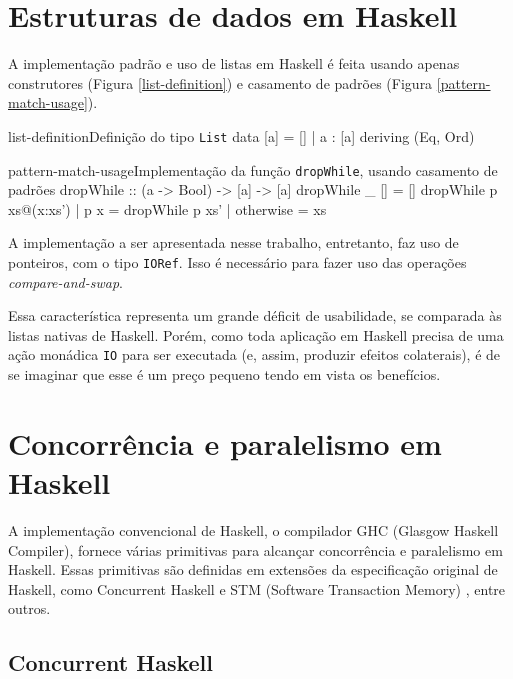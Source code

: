 \documentclass[a4paper,12pt,oldfontcommands]{abntex2}
\begin{document}
\section{Estruturas de dados em Haskell}

A implementação padrão e uso de listas em Haskell é feita usando apenas construtores (Figura \ref{list-definition}) e casamento de padrões (Figura \ref{pattern-match-usage}).

\begin{code}{list-definition}{Definição do tipo \texttt{List} \cite{jones2003haskell}}
data [a] =  [] | a : [a] deriving (Eq, Ord)
\end{code}

\begin{code}{pattern-match-usage}{Implementação da função \texttt{dropWhile}, usando casamento de padrões}
dropWhile :: (a -> Bool) -> [a] -> [a]
dropWhile _ []          =  []
dropWhile p xs@(x:xs')
            | p x       =  dropWhile p xs'
            | otherwise =  xs
\end{code}

A implementação a ser apresentada nesse trabalho, entretanto, faz uso de ponteiros, com o tipo \texttt{IORef}. Isso é necessário para fazer uso das operações \textit{compare-and-swap}.

Essa característica representa um grande déficit de usabilidade, se comparada às listas nativas de Haskell. Porém, como toda aplicação em Haskell precisa de uma ação monádica \texttt{IO} para ser executada (e, assim, produzir efeitos colaterais), é de se imaginar que esse é um preço pequeno tendo em vista os benefícios.

\section{Concorrência e paralelismo em Haskell}

A implementação convencional de Haskell, o compilador GHC (Glasgow Haskell Compiler), fornece várias primitivas para alcançar concorrência e paralelismo em Haskell. Essas primitivas são definidas em extensões da especificação original de Haskell, como Concurrent Haskell \cite{jones1996concurrent} e STM (Software Transaction Memory) \cite{harris2005composable}, entre outros.

\subsection{Concurrent Haskell}
\end{document}

